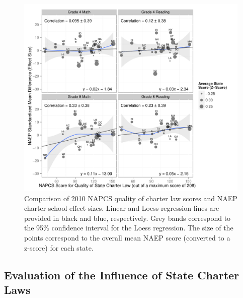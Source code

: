 \documentclass[letterpaper,12pt]{article} %
\begin{document}
\setlength{\belowcaptionskip}{-16pt}
\begin{figure}[t!]
\begin{center}
\includegraphics[width=\textwidth, trim=0 .1in 0 .2in]{../Figures2009/LawScoresVsNAEPDifferences.pdf}
\caption[Comparison of 2010 NAPCS quality of charter law scores and NAEP charter school effect sizes]{Comparison of 2010 NAPCS quality of charter law scores and NAEP charter school effect sizes. Linear and Loess regression lines are provided in black and blue, respectively. Grey bands correspond to the 95\% confidence interval for the Loess regression. The size of the points correspond to the overall mean NAEP score (converted to a z-score) for each state.}
\label{fig:staterankings}
\end{center}
\end{figure}
\setlength{\belowcaptionskip}{0pt}


\subsection{Evaluation of the Influence of State Charter Laws}


\end{document}

